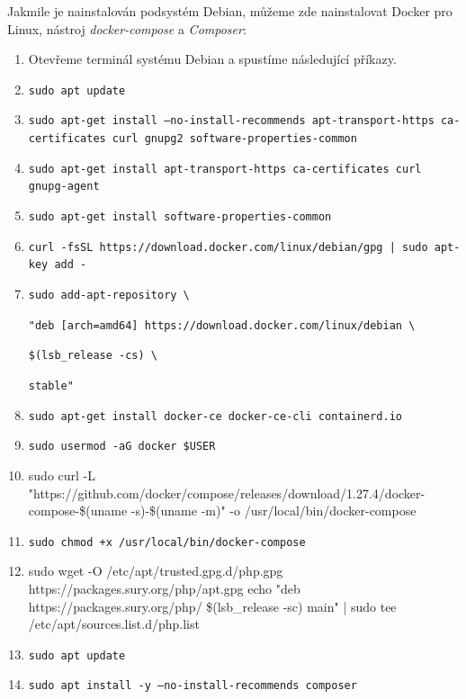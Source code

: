 \documentclass[czech,master]{diploma}
\begin{document}
Jakmile je nainstalován podsystém Debian, můžeme zde nainstalovat Docker pro Linux, nástroj \textit{docker-compose} a \textit{Composer}:
\begin{enumerate}
\item Otevřeme terminál systému Debian a spustíme následující příkazy.
\item \texttt{sudo apt update}
\item \texttt{sudo apt-get install --no-install-recommends apt-transport-https ca-certificates curl gnupg2 software-properties-common}
\item \texttt{sudo apt-get install apt-transport-https ca-certificates curl gnupg-agent}
\item \texttt{sudo apt-get install software-properties-common}
\item \texttt{curl -fsSL https://download.docker.com/linux/debian/gpg | sudo apt-key add -}
\item \texttt{sudo add-apt-repository \textbackslash}

  \texttt{"deb [arch=amd64] https://download.docker.com/linux/debian \textbackslash}
  
  \texttt{\$(lsb\_release -cs) \textbackslash}
  
  \texttt{stable"}

\item \texttt{sudo apt-get install docker-ce docker-ce-cli containerd.io}
\item \texttt{sudo usermod -aG docker \$USER}
\item sudo curl -L "https://github.com/docker/compose/releases/download/1.27.4/docker-compose-\$(uname -s)-\$(uname -m)" -o /usr/local/bin/docker-compose
\item \texttt{sudo chmod +x /usr/local/bin/docker-compose}
\item sudo wget -O /etc/apt/trusted.gpg.d/php.gpg https://packages.sury.org/php/apt.gpg
echo "deb https://packages.sury.org/php/ \$(lsb\_release -sc) main" | sudo tee /etc/apt/sources.list.d/php.list
\item \texttt{sudo apt update}
\item \texttt{sudo apt install -y --no-install-recommends composer}

\end{enumerate}
\end{document}
